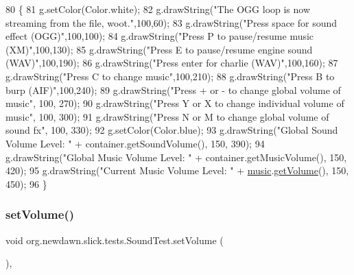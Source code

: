 \begin{DoxyCode}
80                                                             \{
81         g.setColor(Color.white);
82         g.drawString(\textcolor{stringliteral}{"The OGG loop is now streaming from the file, woot."},100,60);
83         g.drawString(\textcolor{stringliteral}{"Press space for sound effect (OGG)"},100,100);
84         g.drawString(\textcolor{stringliteral}{"Press P to pause/resume music (XM)"},100,130);
85         g.drawString(\textcolor{stringliteral}{"Press E to pause/resume engine sound (WAV)"},100,190);
86         g.drawString(\textcolor{stringliteral}{"Press enter for charlie (WAV)"},100,160);
87         g.drawString(\textcolor{stringliteral}{"Press C to change music"},100,210);
88         g.drawString(\textcolor{stringliteral}{"Press B to burp (AIF)"},100,240);
89         g.drawString(\textcolor{stringliteral}{"Press + or - to change global volume of music"}, 100, 270);
90         g.drawString(\textcolor{stringliteral}{"Press Y or X to change individual volume of music"}, 100, 300);
91         g.drawString(\textcolor{stringliteral}{"Press N or M to change global volume of sound fx"}, 100, 330);
92         g.setColor(Color.blue);
93         g.drawString(\textcolor{stringliteral}{"Global Sound Volume Level: "} + container.getSoundVolume(), 150, 390);
94         g.drawString(\textcolor{stringliteral}{"Global Music Volume Level: "} + container.getMusicVolume(), 150, 420);
95         g.drawString(\textcolor{stringliteral}{"Current Music Volume Level: "} + \mbox{\hyperlink{classorg_1_1newdawn_1_1slick_1_1tests_1_1_sound_test_ab3bcadf737e7c10e434f159fdbbcdc32}{music}}.\mbox{\hyperlink{classorg_1_1newdawn_1_1slick_1_1_music_a834f88da09d93163e857587c4e2908f6}{getVolume}}(), 150, 450);
96     \}
\end{DoxyCode}
\mbox{\label{classorg_1_1newdawn_1_1slick_1_1tests_1_1_sound_test_a818b151785f73f691dc4b1a8ed5895bb}} 
\subsubsection{\texorpdfstring{set\+Volume()}{setVolume()}}
{\footnotesize\ttfamily void org.\+newdawn.\+slick.\+tests.\+Sound\+Test.\+set\+Volume (\begin{DoxyParamCaption}{ }\end{DoxyParamCaption})\hspace{0.3cm}{\ttfamily [inline]}, {\ttfamily [private]}}

